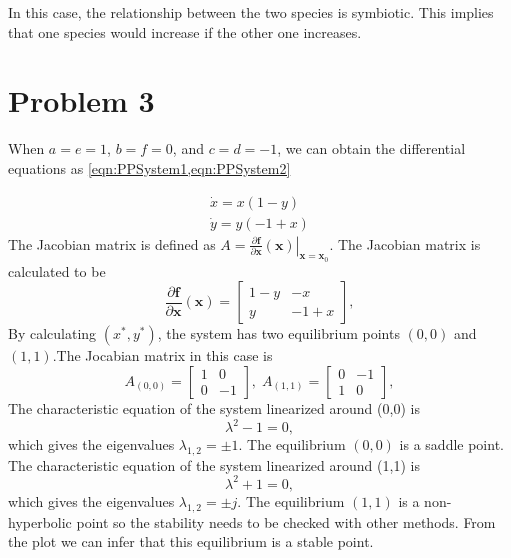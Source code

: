 \documentclass[a4paper,twocolumn]{article} %
\begin{document}
In this case, the relationship between the two species is symbiotic. This implies that one species would increase if the other one increases. 

\section{Problem 3}
\label{sec:prob3} 
When 
$a=e=1$, $b=f=0$, and $c=d=-1$,
  we can obtain the differential equations as \cref{eqn:PPSystem1,eqn:PPSystem2}\par 
\begin{subequations}\label{eqn:PPSystem}
\begin{align}
    \dot{x} = x(1-y) \label{eqn:PPSystem1} \\
    \dot{y} = y(-1+x) \label{eqn:PPSystem2}
\end{align}
\end{subequations}
The Jacobian matrix is defined as $A = \left. \frac{\partial\textbf{f}}{\partial \textbf{x}}(\textbf{x}) \right|_{\textbf{x}=\textbf{x}_0}$. The Jacobian matrix is calculated to be
\begin{equation*}
    \frac{\partial\textbf{f}}{\partial \textbf{x}}(\textbf{x}) =
    \left[\begin{array}{cc}
    1-y & -x \\
    y & -1+x
    \end{array}\right],
\end{equation*}
By calculating $(x^*,y^*)$, the system has two equilibrium points $(0,0)$ and $(1,1)$.The Jocabian matrix in this case is
\begin{equation*}
    A_{(0,0)} =
    \left[\begin{array}{cc}
    1 & 0 \\
    0 & -1
    \end{array}\right], \; A_{(1,1)} =
    \left[\begin{array}{cc}
    0 & -1 \\
    1 & 0
    \end{array}\right],   
    \end{equation*}
 The characteristic equation of the system linearized around \mbox{(0,0)} is
\begin{equation*}
    \lambda^2 -1 = 0,
\end{equation*}
which gives the eigenvalues $\lambda_{1,2} = \pm 1$. The equilibrium $(0,0)$ is a saddle point. 
The characteristic equation of the system linearized around \mbox{(1,1)} is
\begin{equation*}
    \lambda^2 +1 = 0,
\end{equation*}
which gives the eigenvalues $\lambda_{1,2} = \pm j$. The equilibrium $(1,1)$ is a non-hyperbolic point so the stability needs to be checked with other methods. From the plot we can infer that this equilibrium is a stable point.    
\end{document}
